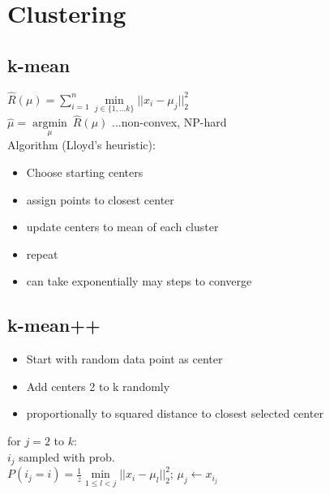 \section*{Clustering}
\subsection*{k-mean}

$\hat{R}(\mu) = \sum_{i=1}^n \underset{j\in\{1,...k\}}{\operatorname{min}}||x_i-\mu_j||_2^2$\\
$\hat{\mu} =  \underset{\mu}{\operatorname{argmin}} ~ \hat{R}(\mu)$ ...non-convex, NP-hard \\
Algorithm (Lloyd's heuristic): 
\begin{itemize}
    \item Choose starting centers
    \item assign points to closest center
    \item update centers to mean of each cluster
    \item repeat
    \item can take exponentially may steps to converge
\end{itemize}
\subsection*{k-mean++}
\begin{itemize}
    \item Start with random data point as center
    \item Add centers 2 to k randomly
    \item  proportionally to squared distance to closest selected center
\end{itemize}
for $j=2$ to $k$: \\
$i_j$ sampled with prob.\\
$P(i_j=i) = \frac{1}{z} \underset{1\leq l<j}{\min}||x_i-\mu_l||_2^2$; $\mu_j \leftarrow x_{i_j}$